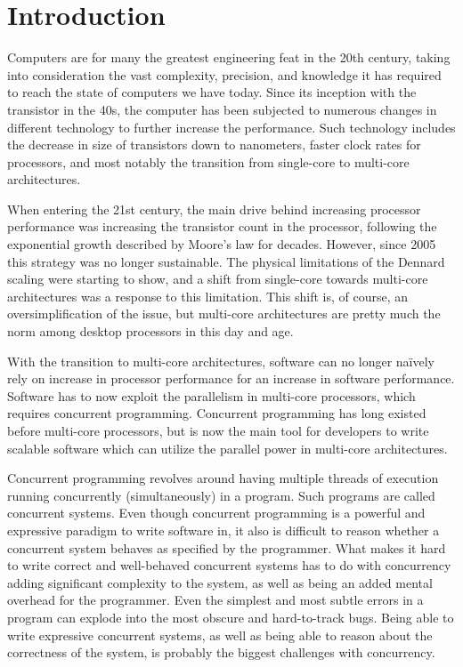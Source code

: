 
\chapter{Introduction}
\label{ch:introduction}

Computers are for many the greatest engineering feat in the 20th century, taking into consideration the vast complexity, precision, and knowledge it has required to reach the state of computers we have today. Since its inception with the transistor in the 40s, the computer has been subjected to numerous changes in different technology to further increase the performance. Such technology includes the decrease in size of transistors down to nanometers, faster clock rates for processors, and most notably the transition from single\hyp{}core to multi\hyp{}core architectures.

When entering the 21st century, the main drive behind increasing processor performance was increasing the transistor count in the processor, following the exponential growth described by Moore's law for decades. However, since 2005 this strategy was no longer sustainable. The physical limitations of the Dennard scaling were starting to show, and a shift from single\hyp{}core towards multi\hyp{}core architectures was a response to this limitation. This shift is, of course, an oversimplification of the issue, but multi\hyp{}core architectures are pretty much the norm among desktop processors in this day and age.

With the transition to multi\hyp{}core architectures, software can no longer naïvely rely on increase in processor performance for an increase in software performance. Software has to now exploit the parallelism in multi\hyp{}core processors, which requires concurrent programming. Concurrent programming has long existed before multi\hyp{}core processors, but is now the main tool for developers to write scalable software which can utilize the parallel power in multi\hyp{}core architectures.

Concurrent programming revolves around having multiple threads of execution running concurrently (simultaneously) in a program. Such programs are called concurrent systems. Even though concurrent programming is a powerful and expressive paradigm to write software in, it also is difficult to reason whether a concurrent system behaves as specified by the programmer. What makes it hard to write correct and well\hyp{}behaved concurrent systems has to do with concurrency adding significant complexity to the system, as well as being an added mental overhead for the programmer. Even the simplest and most subtle errors in a program can explode into the most obscure and hard\hyp{}to\hyp{}track bugs. Being able to write expressive concurrent systems, as well as being able to reason about the correctness of the system, is probably the biggest challenges with concurrency.

